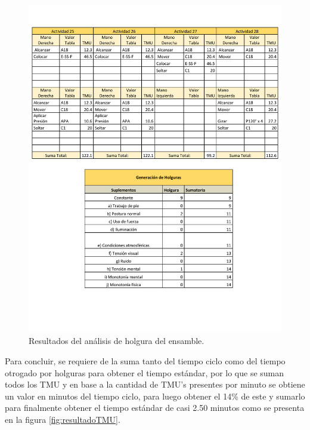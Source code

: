             \begin{figure}[H]
        \centering
        \includegraphics[trim = {25mm 30mm 1mm 140mm},clip,scale=0.4]{19/Img/tablaTMU5.pdf}
        \newpage
        \caption{Resultados del análisis de holgura del ensamble.}
        \label{fig:tablaHolguraTMU}    
    \end{figure}
    Para concluir, se requiere de la suma tanto del tiempo ciclo como del tiempo otrogado por holguras para obtener el tiempo estándar, por lo que se suman todos los TMU y en base a la cantidad de TMU's presentes por minuto se obtiene un valor en minutos del tiempo ciclo, para luego obtener el 14\% de este y sumarlo para finalmente obtener el tiempo estándar de casi 2.50 minutos como se presenta en la figura \ref{fig:resultadoTMU}.
